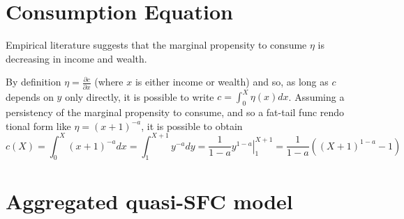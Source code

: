 \documentclass[a4paper, headings=standardclasses]{scrartcl}
\numberwithin{equation}{subsection}
\begin{document}
\section{Consumption Equation}
\label{sec:consumption}
Empirical literature \parencite{fisher2020} suggests that the marginal propensity to consume $\eta$ is decreasing in income and wealth.

By definition $\eta = \frac{\partial c}{\partial x}$ (where $x$ is either income or wealth) and so, as long as $c$ depends on $y$ only directly, it is possible to write $c = \int_{0}^{X} \eta(x) dx$.
Assuming a persistency of the marginal propensity to consume, and so a fat-tail func rendo tional form like $\eta = (x+1)^{-a}$, it is possible to obtain
$$c(X) = \int_{0}^{X} (x+1)^{-a} dx = \int_{1}^{X+1} y^{-a} dy = \frac{1}{1-a}\left.y^{1-a}\right|_1^{X+1} = \frac{1}{1-a} ((X+1)^{1-a}-1)$$

\section{Aggregated quasi-SFC model}
\end{document}
